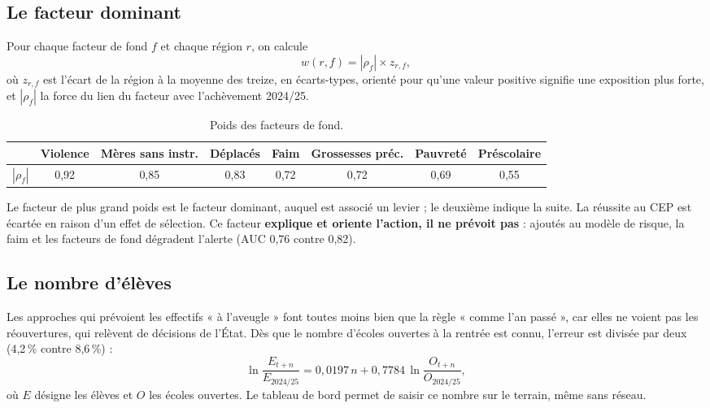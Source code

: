 \documentclass[11pt,a4paper]{article}
\begin{document}
\subsection{Le facteur dominant}
Pour chaque facteur de fond $f$ et chaque région $r$, on calcule
\begin{equation}
w(r,f) = |\rho_f| \times z_{r,f},
\end{equation}
où $z_{r,f}$ est l'écart de la région à la moyenne des treize, en écarts-types, orienté pour qu'une valeur positive signifie une exposition plus forte, et $|\rho_f|$ la force du lien du facteur avec l'achèvement 2024/25.
\begin{table}[H]\centering\small
\begin{tabular}{@{}lccccccc@{}}\toprule
 & Violence & Mères sans instr. & Déplacés & Faim & Grossesses préc. & Pauvreté & Préscolaire\\\midrule
$|\rho_f|$ & 0,92 & 0,85 & 0,83 & 0,72 & 0,72 & 0,69 & 0,55\\\bottomrule
\end{tabular}\caption{Poids des facteurs de fond.}\end{table}
Le facteur de plus grand poids est le facteur dominant, auquel est associé un levier ; le deuxième indique la suite. La réussite au CEP est écartée en raison d'un effet de sélection. Ce facteur \textbf{explique et oriente l'action, il ne prévoit pas} : ajoutés au modèle de risque, la faim et les facteurs de fond dégradent l'alerte (AUC 0,76 contre 0,82).

\subsection{Le nombre d'élèves}
Les approches qui prévoient les effectifs « à l'aveugle » font toutes moins bien que la règle « comme l'an passé », car elles ne voient pas les réouvertures, qui relèvent de décisions de l'État. Dès que le nombre d'écoles ouvertes à la rentrée est connu, l'erreur est divisée par deux (4{,}2\,\% contre 8{,}6\,\%) :
\begin{equation}
\ln\frac{E_{t+n}}{E_{2024/25}} = 0{,}0197\,n + 0{,}7784\,\ln\frac{O_{t+n}}{O_{2024/25}},
\end{equation}
où $E$ désigne les élèves et $O$ les écoles ouvertes. Le tableau de bord permet de saisir ce nombre sur le terrain, même sans réseau.
\end{document}
